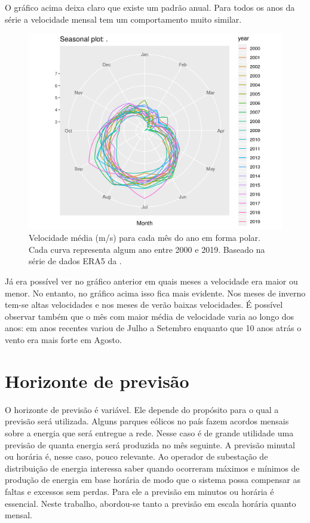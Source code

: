 \documentclass[
	12pt,				%
	openright,			%
	oneside,			%
	a4paper,			%
	english,			%
	french,				%
	spanish,			%
	brazil				%
	]{abntex2}
\begin{document}
O gráfico acima deixa claro que existe um padrão anual. Para todos os anos da série a velocidade mensal tem um comportamento muito similar.

\begin{figure}[h]
    \centering
	\includegraphics[width=\textwidth]{season_plot_polar}
	\caption{Velocidade média (m/s) para cada mês do ano em forma polar. Cada curva representa algum ano entre 2000 e 2019. Baseado na série de dados ERA5 da \cite{era5}.}
\end{figure}
\FloatBarrier

Já era possível ver no gráfico anterior em quais meses a velocidade era maior ou menor. No entanto, no gráfico acima isso fica mais evidente. Nos meses de inverno tem-se altas velocidades e nos meses de verão baixas velocidades. É possível observar também que o mês com maior média de velocidade varia ao longo dos anos: em anos recentes variou de Julho a Setembro enquanto que 10 anos atrás o vento era mais forte em Agosto.

\section{Horizonte de previsão}

O horizonte de previsão é variável. Ele depende do propósito para o qual a previsão será utilizada. Alguns parques eólicos no país fazem acordos mensais sobre a energia que será entregue a rede. Nesse caso é de grande utilidade uma previsão de quanta energia será produzida no mês seguinte. A previsão minutal ou horária é, nesse caso, pouco relevante.
Ao operador de subestação de distribuição de energia interessa saber quando ocorreram máximos e mínimos de produção de energia em base horária de modo que o sistema possa compensar as faltas e excessos sem perdas. Para ele a previsão em minutos ou horária é essencial. Neste trabalho, abordou-se tanto a previsão em escala horária quanto mensal.
\end{document}
